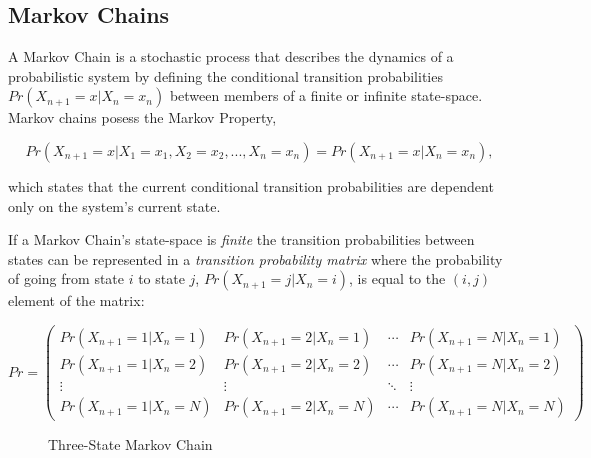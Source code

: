 \subsection{Markov Chains}

A Markov Chain is a stochastic process that describes the dynamics of a probabilistic system by defining the conditional transition probabilities \(Pr(X_{n+1}=x|X_n=x_n)\) between members of a finite or infinite state-space. Markov chains posess the Markov Property,

\[
Pr(X_{n+1}=x|X_1=x_1,X_2=x_2,...,X_n=x_n) = Pr(X_{n+1}=x|X_n=x_n),
\]

which states that the current conditional transition probabilities are dependent only on the system's current state.

If a Markov Chain's state-space is \textit{finite} the transition probabilities between states can be represented in a \textit{transition probability matrix} where the probability of going from state $i$ to state $j$, $Pr(X_{n+1}=j|X_n=i)$, is equal to the $(i,j)$ element of the matrix:

\[
 Pr =
 \begin{pmatrix}
  Pr(X_{n+1}=1|X_n=1) & Pr(X_{n+1}=2|X_n=1) & \cdots & Pr(X_{n+1}=N|X_n=1) \\
  Pr(X_{n+1}=1|X_n=2) & Pr(X_{n+1}=2|X_n=2) & \cdots & Pr(X_{n+1}=N|X_n=2) \\
  \vdots  & \vdots  & \ddots & \vdots  \\
  Pr(X_{n+1}=1|X_n=N) & Pr(X_{n+1}=2|X_n=N) & \cdots & Pr(X_{n+1}=N|X_n=N)
 \end{pmatrix}
\]

\begin{figure}[h!]
\begin{center}
\end{center}
\caption{Three-State Markov Chain}
\label{3statemarkovchain}
\end{figure}

